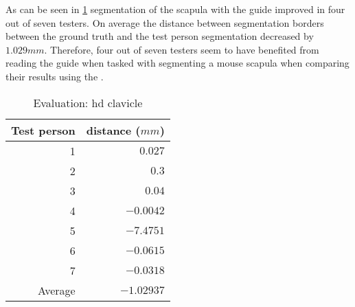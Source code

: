 \noindent
As can be seen in \cref{tab:clavicle-distance} segmentation of the scapula with the guide improved in four out of seven testers.
On average the distance between segmentation borders between the ground truth and the test person segmentation decreased by $1.029mm$.
Therefore, four out of seven testers seem to have benefited from reading the guide when tasked with segmenting a mouse scapula 
when comparing their results using the .
\begin{table}[ht]
	\begin{center}
		\begin{tabular}{r r}
			\textbf{Test person} & \textbf{distance ($mm$)} \\
			\hline
			1                    & $0.027$                  \\
			2                    & $0.3$                    \\
			3                    & $0.04$                   \\
			4                    & $-0.0042$                \\
			5                    & $-7.4751$                \\
			6                    & $-0.0615$                \\
			7                    & $-0.0318$                \\
			\hline
			Average              & $-1.02937$               \\
		\end{tabular}
		\caption{Evaluation: \acrshort{hd} clavicle}\label{tab:clavicle-distance}
	\end{center}
\end{table}



